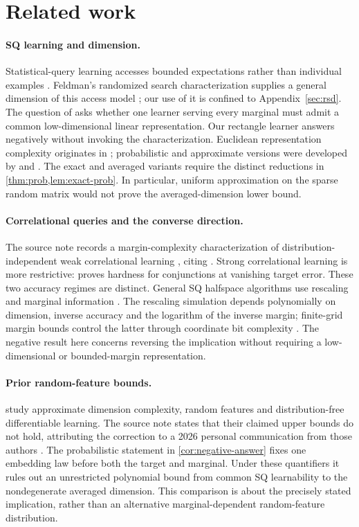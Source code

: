 \section{Related work}\label{sec:related}
\paragraph{SQ learning and dimension.}
Statistical-query learning accesses bounded expectations rather than individual examples \citep{Kearns98}. Feldman's randomized search characterization supplies a general dimension of this access model \citep{Feldman17}; our use of it is confined to Appendix~\ref{sec:rsd}. The question of \citet{FKS26} asks whether one learner serving every marginal must admit a common low-dimensional linear representation. Our rectangle learner answers negatively without invoking the characterization. Euclidean representation complexity originates in \citet{BDES02}; probabilistic and approximate versions were developed by \citet{CMW25} and \citet{KMS20}. The exact and averaged variants require the distinct reductions in \cref{thm:prob,lem:exact-prob}. In particular, uniform approximation on the sparse random matrix would not prove the averaged-dimension lower bound.

\paragraph{Correlational queries and the converse direction.}
The source note records a margin-complexity characterization of distribution-independent weak correlational learning \citep[Section~3]{FKS26}, citing \citet{Feldman08}. Strong correlational learning is more restrictive: \citet{Feldman11} proves hardness for conjunctions at vanishing target error. These two accuracy regimes are distinct. General SQ halfspace algorithms use rescaling and marginal information \citep{DV04,BF13}. The rescaling simulation depends polynomially on dimension, inverse accuracy and the logarithm of the inverse margin; finite-grid margin bounds control the latter through coordinate bit complexity \citep{GSS13}. The negative result here concerns reversing the implication without requiring a low-dimensional or bounded-margin representation.

\paragraph{Prior random-feature bounds.}
\citet{KM25} study approximate dimension complexity, random features and distribution-free differentiable learning. The source note states that their claimed upper bounds do not hold, attributing the correction to a 2026 personal communication from those authors \citep[Section~3]{FKS26}. The probabilistic statement in \cref{cor:negative-answer} fixes one embedding law before both the target and marginal. Under these quantifiers it rules out an unrestricted polynomial bound from common SQ learnability to the nondegenerate averaged dimension. This comparison is about the precisely stated implication, rather than an alternative marginal-dependent random-feature distribution.

